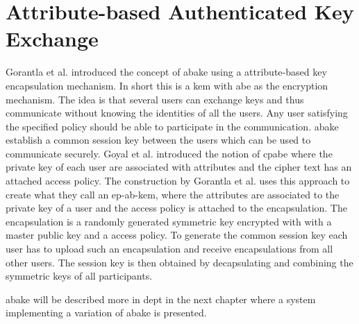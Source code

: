 \section{Attribute-based Authenticated Key Exchange}\label{sec:abake}
Gorantla et al.\cite{gorantla2010attribute} introduced the concept of \gls{abake} using a attribute-based key encapsulation mechanism. In short this is a \gls{kem} with \gls{abe} as the encryption mechanism. The idea is that several users can exchange keys and thus communicate without knowing the identities of all the users. Any user satisfying the specified policy should be able to participate in the communication. \gls{abake} establish a common session key between the users which can be used to communicate securely. Goyal et al. \cite{ABE} introduced the notion of \gls{cpabe} where the private key of each user are associated with attributes and the cipher text has an attached access policy. The construction by Gorantla et al.\cite{gorantla2010attribute} uses this approach to create what they call an \gls{ep-ab-kem}, where the attributes are associated to the private key of a user and the access policy is attached to the encapsulation. The encapsulation is a randomly generated symmetric key encrypted with with a master public key and a access policy. To generate the common session key each user has to upload such an encapsulation and receive encapsulations from all other users. The session key is then obtained by decapsulating and combining the symmetric keys of all participants. 
\par \Gls{abake} will be described more in dept in the next chapter where a system implementing a variation of \gls{abake} is presented. 


